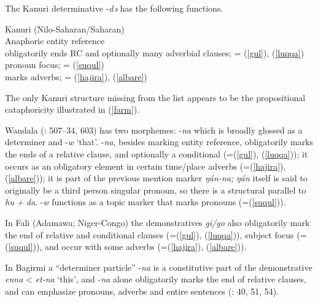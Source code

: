 \documentclass[output=paper]{langsci/langscibook}
\begin{document}
The Kanuri determinative -\textit{də} has the following functions.

\ea\label{kanuri} 
{}{}{Kanuri (Nilo-Saharan/Saharan)}\\

{}{}{Anaphoric entity reference}\\
  \ea\label{ex:nigeria:}
{}{}{obligatorily ends RC and optionally many adverbial clauses}; = (\ref{gul}), (\ref{luqqa})\\
\ex\label{ex:nigeria:}
{}{}{pronoun focus}; = (\ref{suqul})\\
\ex\label{ex:nigeria:}
{}{}{marks adverbs}; = (\ref{hajira}), (\ref{albare})\\
\z
\z

The only Kanuri structure missing from the list appears to be the propositional cataphoricity illustrated in (\ref{farm}).

Wandala (\citealt{Frajzyngier2012}: 507–34, 603) has two morphemes: -\textit{na} which is broadly glossed as a determiner and -\textit{w} ‘that’. -\textit{na}, besides marking entity reference, obligatorily marks the ends of a relative clause, and optionally a conditional (=(\ref{gul}), (\ref{luqqa})); it occurs as an obligatory element in certain time/place adverbs (=(\ref{hajira}), (\ref{albare})); it is part of the previous mention marker \textit{ŋán-na;} \textit{ŋán} itself is said to originally be a third person singular pronoun, so there is a structural parallel to \textit{hu} \textit{+} \textit{da}. -\textit{w} functions as a topic marker that marks pronouns (=(\ref{suqul})).

In Fali (Adamawa; Niger-Congo) the demonstratives \textit{gi/go} also obligatorily mark the end of relative and conditional clauses (=(\ref{gul}), (\ref{luqqa})), subject focus (=(\ref{suqul})), and occur with some adverbs (=(\ref{hajira}), (\ref{albare})).

In Bagirmi a “determiner particle” -\textit{na} is a constitutive part of the demonstrative \textit{enna} < \textit{et-na} ‘this’, and -\textit{na} alone obligatorily marks the end of relative clauses, and can emphasize pronouns, adverbs and entire sentences (\citealt{Stevenson1969}: 40, 51, 54). 
\end{document}
